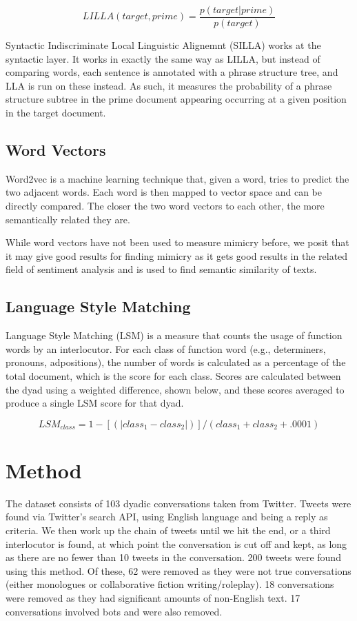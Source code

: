 \documentclass[conference]{IEEEtran}
\begin{document}
\[LILLA(target, prime) = \frac{p(target|prime)}{p(target)}\]

Syntactic Indiscriminate Local Linguistic Alignemnt (SILLA) works at the syntactic layer. It works in exactly the same way as LILLA, but instead of comparing words, each sentence is annotated with a phrase structure tree, and LLA is run on these instead. As such, it measures the probability of a phrase structure subtree in the prime document appearing occurring at a given position in the target document.

\subsection{Word Vectors}
Word2vec \cite{mikolov2013efficient, mikolov2013distributed} is a machine learning technique that, given a word, tries to predict the two adjacent words. Each word is then mapped to vector space and can be directly compared. The closer the two word vectors to each other, the more semantically related they are.

While word vectors have not been used to measure mimicry before, we posit that it may give good results for finding mimicry as it gets good results in the related field of sentiment analysis and is used to find semantic similarity of texts.

\subsection{Language Style Matching}
Language Style Matching (LSM) \cite{ireland2010language, ireland2011language} is a measure that counts the usage of function words by an interlocutor. For each class of function word (e.g., determiners, pronouns, adpositions), the number of words is  calculated as a percentage of the total document, which is the score for each class. Scores are calculated between the dyad using a weighted difference, shown below, and these scores averaged to produce a single LSM score for that dyad.

\[ LSM_{class} = 1 - [(|class_1 - class_2|)] / (class_1 + class_2 + .0001) \]


\section{Method}
The dataset consists of 103 dyadic conversations taken from Twitter. Tweets were found via Twitter's  search API, using English language and being a reply as criteria. We then work up the chain of tweets  until we hit the end, or a third interlocutor is found, at which point the conversation is cut off and  kept, as long as there are no fewer than 10 tweets in the conversation. 200 tweets were found using  this method. Of these, 62 were removed as they were not true conversations (either monologues or  collaborative fiction writing/roleplay). 18 conversations were removed as they had significant amounts  of non-English text. 17 conversations involved bots and were also removed.
\end{document}
